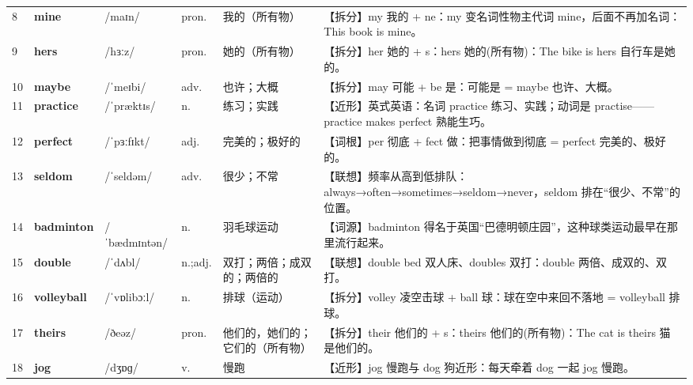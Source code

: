 \documentclass[UTF8,a4paper,11pt,oneside]{ctexbook}
\newcommand{\cellword}[1]{{\bfseries\textcolor{wordcol}{#1}}}
\newcommand{\cellipa}[1]{{\footnotesize\textcolor{ipacol}{#1}}}
\newcommand{\cellpos}[1]{\textcolor{poscol}{#1}}
\newcommand{\cellno}[1]{\textcolor{volcolor!75!black}{#1}}
\begin{document}
{\begin{longtable}{@{}C{0.045\textwidth}L{0.155\textwidth}L{0.175\textwidth}C{0.070\textwidth}L{0.180\textwidth}L{0.282\textwidth}@{}}
\cellno{8} & \cellword{mine} & \cellipa{/maɪn/} & \cellpos{pron.} & 我的（所有物） & \textcolor{tagSplit}{【拆分】}my 我的 + ne：my 变名词性物主代词 mine，后面不再加名词：This book is mine。 \\
 \cellno{9} & \cellword{hers} & \cellipa{/hɜːz/} & \cellpos{pron.} & 她的（所有物） & \textcolor{tagSplit}{【拆分】}her 她的 + s：hers 她的(所有物)：The bike is hers 自行车是她的。 \\
\cellno{10} & \cellword{maybe} & \cellipa{/ˈmeɪbi/} & \cellpos{adv.} & 也许；大概 & \textcolor{tagSplit}{【拆分】}may 可能 + be 是：可能是 = maybe 也许、大概。 \\
 \cellno{11} & \cellword{practice} & \cellipa{/ˈpræktɪs/} & \cellpos{n.} & 练习；实践 & \textcolor{tagNear}{【近形】}英式英语：名词 practice 练习、实践；动词是 practise——practice makes perfect 熟能生巧。 \\
\cellno{12} & \cellword{perfect} & \cellipa{/ˈpɜːfɪkt/} & \cellpos{adj.} & 完美的；极好的 & \textcolor{tagRoot}{【词根】}per 彻底 + fect 做：把事情做到彻底 = perfect 完美的、极好的。 \\
 \cellno{13} & \cellword{seldom} & \cellipa{/ˈseldəm/} & \cellpos{adv.} & 很少；不常 & \textcolor{tagAssoc}{【联想】}频率从高到低排队：always→\allowbreak{}often→\allowbreak{}sometimes→\allowbreak{}seldom→\allowbreak{}never，seldom 排在“很少、不常”的位置。 \\
\cellno{14} & \cellword{badminton} & \cellipa{/ˈbædmɪntən/} & \cellpos{n.} & 羽毛球运动 & \textcolor{tagEtym}{【词源】}badminton 得名于英国“巴德明顿庄园”，这种球类运动最早在那里流行起来。 \\
 \cellno{15} & \cellword{double} & \cellipa{/ˈdʌbl/} & \cellpos{n.;\allowbreak{}adj.} & 双打；两倍；成双的；两倍的 & \textcolor{tagAssoc}{【联想】}double bed 双人床、doubles 双打：double 两倍、成双的、双打。 \\
\cellno{16} & \cellword{volleyball} & \cellipa{/ˈvɒlibɔːl/} & \cellpos{n.} & 排球（运动） & \textcolor{tagSplit}{【拆分】}volley 凌空击球 + ball 球：球在空中来回不落地 = volleyball 排球。 \\
 \cellno{17} & \cellword{theirs} & \cellipa{/ðeəz/} & \cellpos{pron.} & 他们的，她们的；它们的（所有物） & \textcolor{tagSplit}{【拆分】}their 他们的 + s：theirs 他们的(所有物)：The cat is theirs 猫是他们的。 \\
\cellno{18} & \cellword{jog} & \cellipa{/dʒɒɡ/} & \cellpos{v.} & 慢跑 & \textcolor{tagNear}{【近形】}jog 慢跑与 dog 狗近形：每天牵着 dog 一起 jog 慢跑。 \\

\end{longtable}}
\end{document}
